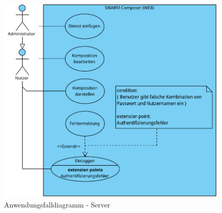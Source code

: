 \begin{figure}[h]
	\centering
	\includegraphics[width=\textwidth]{img/Produktfunktionen_web}
	\caption{Anwendungsfalldiagramm - Server}
	\label{fig:anwendungsfalldiagramm-server}
\end{figure}

\newpage

